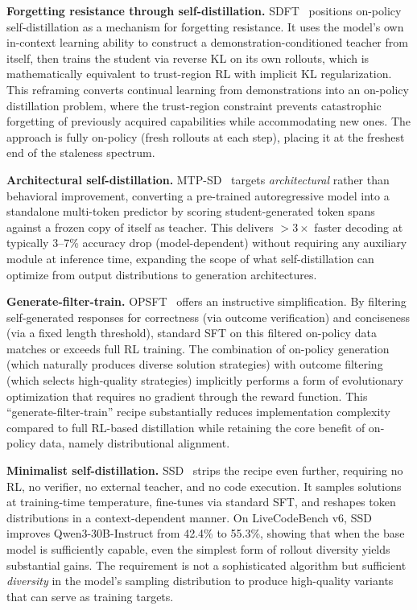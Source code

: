 \documentclass{article} %
\begin{document}
\textbf{Forgetting resistance through self-distillation.} SDFT~\citep{2601.19897} positions on-policy self-distillation as a mechanism for forgetting resistance. It uses the model's own in-context learning ability to construct a demonstration-conditioned teacher from itself, then trains the student via reverse KL on its own rollouts, which is mathematically equivalent to trust-region RL with implicit KL regularization. This reframing converts continual learning from demonstrations into an on-policy distillation problem, where the trust-region constraint prevents catastrophic forgetting of previously acquired capabilities while accommodating new ones. The approach is fully on-policy (fresh rollouts at each step), placing it at the freshest end of the staleness spectrum.

\textbf{Architectural self-distillation.} MTP-SD~\citep{2602.06019} targets \emph{architectural} rather than behavioral improvement, converting a pre-trained autoregressive model into a standalone multi-token predictor by scoring student-generated token spans against a frozen copy of itself as teacher. This delivers $>3\times$ faster decoding at typically 3--7\% accuracy drop (model-dependent) without requiring any auxiliary module at inference time, expanding the scope of what self-distillation can optimize from output distributions to generation architectures.

\textbf{Generate-filter-train.} OPSFT~\citep{zhao2026onpolicy} offers an instructive simplification. By filtering self-generated responses for correctness (via outcome verification) and conciseness (via a fixed length threshold), standard SFT on this filtered on-policy data matches or exceeds full RL training. The combination of on-policy generation (which naturally produces diverse solution strategies) with outcome filtering (which selects high-quality strategies) implicitly performs a form of evolutionary optimization that requires no gradient through the reward function. This ``generate-filter-train'' recipe substantially reduces implementation complexity compared to full RL-based distillation while retaining the core benefit of on-policy data, namely distributional alignment.

\textbf{Minimalist self-distillation.} SSD~\citep{zhang2026embarrassingly} strips the recipe even further, requiring no RL, no verifier, no external teacher, and no code execution. It samples solutions at training-time temperature, fine-tunes via standard SFT, and reshapes token distributions in a context-dependent manner. On LiveCodeBench v6, SSD improves Qwen3-30B-Instruct from 42.4\% to 55.3\%, showing that when the base model is sufficiently capable, even the simplest form of rollout diversity yields substantial gains. The requirement is not a sophisticated algorithm but sufficient \emph{diversity} in the model's sampling distribution to produce high-quality variants that can serve as training targets.
\end{document}
